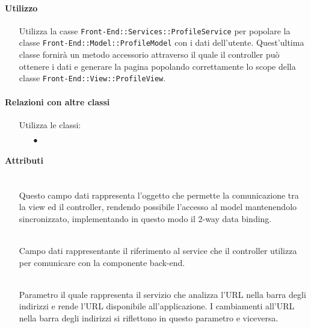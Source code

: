 \paragraph*{Utilizzo}
\begin{itemize}
\item[] Utilizza la casse \texttt{Front-End::Services::ProfileService} per popolare la classe \texttt{Front-End::Model::ProfileModel} con i dati dell'utente. Quest'ultima classe fornirà un metodo accessorio attraverso il quale il controller può ottenere i dati e generare la pagina popolando correttamente lo scope della classe \texttt{Front-End::View::ProfileView}.
\end{itemize}

\paragraph*{Relazioni con altre classi}
\begin{itemize}


\item[] Utilizza le classi:
\begin{itemize}
\item[$\bullet$] 
\end{itemize}
\end{itemize}

\paragraph*{Attributi}
\begin{itemize}
\item[]  \\ Questo campo dati rappresenta l'oggetto che permette la comunicazione tra la view ed il controller, rendendo possibile l’accesso al model mantenendolo sincronizzato, implementando in questo modo il 2-way data binding.
\item[]  \\ Campo dati rappresentante il riferimento al service che il controller utilizza per comunicare con la componente back-end.
\item[]  \\ Parametro il quale rappresenta il servizio che analizza l'URL nella barra degli indirizzi e rende l'URL disponibile all'applicazione. I cambiamenti all'URL nella barra degli indirizzi si riflettono in questo parametro e viceversa.
\end{itemize}

